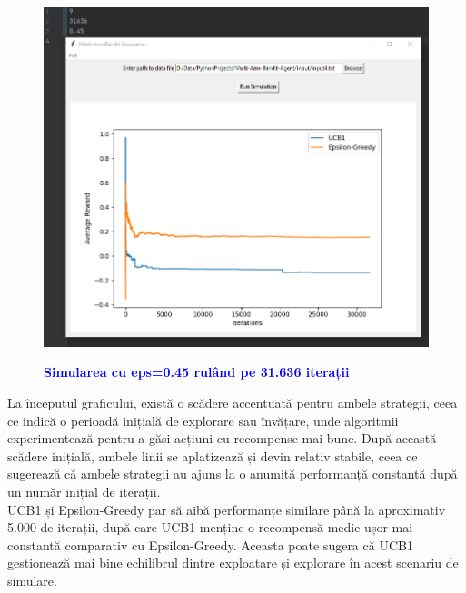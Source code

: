 \documentclass{article}
\begin{document}
\newpage
\begin{figure}[h]
    \centering
    \includegraphics[width=1\linewidth]{plot generation 4.png}
    \bfseries\caption{\textcolor{blue}{\textbf{Simularea cu eps=0.45 rulând pe 31.636 iterații}}}
\end{figure}
La începutul graficului, există o scădere accentuată pentru ambele strategii, ceea ce indică o perioadă inițială de explorare sau învățare, unde algoritmii experimentează pentru a găsi acțiuni cu recompense mai bune. După această scădere inițială, ambele linii se aplatizează și devin relativ stabile, ceea ce sugerează că ambele strategii au ajuns la o anumită performanță constantă după un număr inițial de iterații.\\
UCB1 și Epsilon-Greedy par să aibă performanțe similare până la aproximativ 5.000 de iterații, după care UCB1 menține o recompensă medie ușor mai constantă comparativ cu Epsilon-Greedy. Aceasta poate sugera că UCB1 gestionează mai bine echilibrul dintre exploatare și explorare în acest scenariu de simulare.\\\\\\
\end{document}
